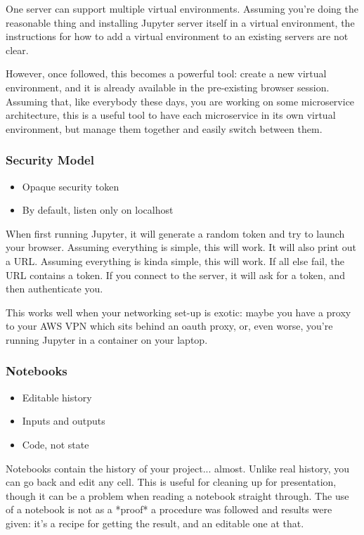 One server can support multiple virtual environments.
Assuming you're doing the reasonable thing and installing
Jupyter server itself in a virtual environment,
the instructions for how to add a virtual environment
to an existing servers are not clear.

However,
once followed,
this becomes a powerful tool:
create a new virtual environment,
and it is already available in the pre-existing browser session.
Assuming that,
like everybody these days,
you are working on some microservice architecture,
this is a useful tool to have each microservice in its own virtual environment,
but manage them together and easily switch between them.

\begin{frame}
\frametitle{Security Model}

\begin{itemize}
\item Opaque security token
\item By default, listen only on localhost
\end{itemize}

\end{frame}

When first running Jupyter,
it will generate a random token and try to launch your browser.
Assuming everything is simple, this will work.
It will also print out a URL.
Assuming everything is kinda simple, this will work.
If all else fail,
the URL contains a token.
If you connect to the server,
it will ask for a token,
and then authenticate you.

This works well when your networking set-up is exotic:
maybe you have a proxy to your AWS VPN which sits behind an oauth proxy,
or,
even worse,
you're running Jupyter in a container on your laptop.

\begin{frame}
\frametitle{Notebooks}

\begin{itemize}
\item Editable history
\item Inputs and outputs
\item Code, not state
\end{itemize}

\end{frame}

Notebooks contain the history of your project...
almost.
Unlike real history,
you can go back and edit any cell.
This is useful for cleaning up for presentation,
though it can be a problem when reading a notebook straight through.
The use of a notebook is not as a *proof* a procedure
was followed and results were given:
it's a recipe for getting the result,
and an editable one at that.

